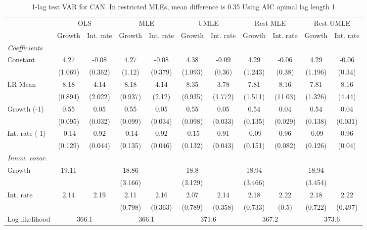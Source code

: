 \begin{table}[htbp] 
	\centering
	\begin{tabular}{@{\extracolsep{4pt}}lcccccccccc@{}}		\hline\hline
		 		 & \multicolumn{2}{c}{OLS} &\multicolumn{2}{c}{MLE} &\multicolumn{2}{c}{UMLE} &\multicolumn{2}{c}{Rest MLE} &\multicolumn{2}{c}{Rest UMLE} \\ 
 		 & Growth 	 & Int. rate 	 & Growth 	 & Int. rate 	 & Growth 	 & Int. rate 	 & Growth 	 & Int. rate 	 & Growth 	 & Int. rate\\\cline{2-3}\cline{4-5}\cline{6-7}\cline{8-9}\cline{10-11}
\rule{0pt}{4ex} 
 \emph{Coefficients} 	  		 & 		 & 		 & 		 & 		 & 		 & 		 & 		 & 		 & 		 &\\ 
\quad Constant 	 & 4.27 	 & -0.08 	 & 4.27 	 & -0.08 	 & 4.38 	 & -0.09 	 & 4.29 	 & -0.06 	 & 4.29 	 & -0.06	 \\ 
 		 & (1.069) 	 & (0.362) 	 & (1.12) 	 & (0.379) 	 & (1.093) 	 & (0.36) 	 & (1.243) 	 & (0.38) 	 & (1.196) 	 & (0.34) 	 \\ 
\quad LR Mean 	 & 8.18 	 & 4.14 	 & 8.18 	 & 4.14 	 & 8.35 	 & 3.78 	 & 7.81 	 & 8.16 	 & 7.81 	 & 8.16	 \\ 
 		 & (0.894) 	 & (2.022) 	 & (0.937) 	 & (2.12) 	 & (0.935) 	 & (1.772) 	 & (1.511) 	 & (11.03) 	 & (1.326) 	 & (4.44) 	 \\ 
\quad Growth (-1) 	 &0.55 	 & 0.05 	 & 0.55 	 & 0.05 	 & 0.55 	 & 0.05 	 & 0.54 	 & 0.04 	 & 0.54 	 & 0.04	 \\ 
 		 & (0.095) 	 & (0.032) 	 & (0.099) 	 & (0.034) 	 & (0.098) 	 & (0.033) 	 & (0.135) 	 & (0.029) 	 & (0.138) 	 & (0.031) 	 \\ 
\quad Int. rate (-1) 	 &-0.14 	 & 0.92 	 & -0.14 	 & 0.92 	 & -0.15 	 & 0.91 	 & -0.09 	 & 0.96 	 & -0.09 	 & 0.96	 \\ 
 		 & (0.129) 	 & (0.044) 	 & (0.135) 	 & (0.046) 	 & (0.132) 	 & (0.043) 	 & (0.151) 	 & (0.082) 	 & (0.126) 	 & (0.04) 	 \\ 
\rule{0pt}{4ex} \emph{Innov. covar.}  	 & 	 & 	 & 	 & 	 & 	 & 	 & 	 & 	 & 	 &\\ 
\quad Growth 	 &19.11 	 &  	 & 18.86 	 &  	 & 18.8 	 &  	 & 18.94 	 &  	 & 18.94 	 & 	 \\ 
 		 &  	 &  	 & (3.166) 	 &  	 & (3.129) 	 &  	 & (3.466) 	 &  	 & (3.454) 	 &  	 \\ 
\quad Int. rate 	 &2.14 	 & 2.19 	 & 2.11 	 & 2.16 	 & 2.07 	 & 2.14 	 & 2.18 	 & 2.22 	 & 2.18 	 & 2.22	 \\ 
 		 &  	 &  	 & (0.798) 	 & (0.363) 	 & (0.789) 	 & (0.358) 	 & (0.733) 	 & (0.5) 	 & (0.722) 	 & (0.497) 	 \\ 
 \hline \rule{0pt}{4ex} 
  Log likelihood 	 &\multicolumn{2}{c}{366.1} 	 & \multicolumn{2}{c}{366.1} 	 & \multicolumn{2}{c}{371.6} 	 & \multicolumn{2}{c}{367.2} 	 & \multicolumn{2}{c}{373.6}\\ 

 \hline 	\end{tabular}		\caption{1-lag test VAR for CAN. In restricted MLEs, mean difference is 0.35 Using AIC opimal lag length 1}
		\label{tab:CANopt_}

\end{table}